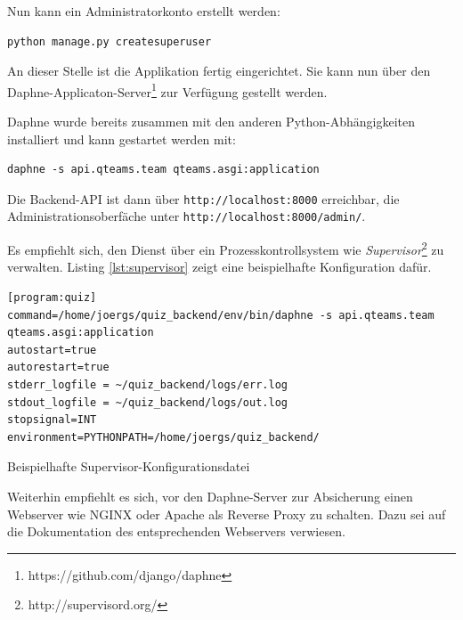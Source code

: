 \documentclass[a4paper,11pt,listof=numbered,glossary=totoc,parskip=half,toc=bib]{scrreprt}
\begin{document}
\begin{appendices}
	Nun kann ein Administratorkonto erstellt werden:
	
	\begin{verbatim}
python manage.py createsuperuser
	\end{verbatim}
	
	An dieser Stelle ist die Applikation fertig eingerichtet. Sie kann nun über den Daphne-Applicaton-Server\footnote{https://github.com/django/daphne} zur Verfügung gestellt werden. 
	
	Daphne wurde bereits zusammen mit den anderen Python-Abhängigkeiten installiert und kann gestartet werden mit:
	
	\begin{verbatim}
daphne -s api.qteams.team qteams.asgi:application
	\end{verbatim}
	
	Die Backend-API ist dann über \texttt{http://localhost:8000} erreichbar, die Administrationsoberfäche unter \texttt{http://localhost:8000/admin/}.
	
	Es empfiehlt sich, den Dienst über ein Prozesskontrollsystem wie \textit{Supervisor}\footnote{http://supervisord.org/} zu verwalten. Listing \ref{lst:supervisor} zeigt eine beispielhafte Konfiguration dafür.
	
	\begin{listing}
		\begin{verbatim}
[program:quiz]
command=/home/joergs/quiz_backend/env/bin/daphne -s api.qteams.team qteams.asgi:application
autostart=true
autorestart=true
stderr_logfile = ~/quiz_backend/logs/err.log
stdout_logfile = ~/quiz_backend/logs/out.log
stopsignal=INT
environment=PYTHONPATH=/home/joergs/quiz_backend/
		\end{verbatim}
		\caption{Beispielhafte Supervisor-Konfigurationsdatei}
		\label{lst:supervisor}
	\end{listing}
	
	Weiterhin empfiehlt es sich, vor den Daphne-Server zur Absicherung einen Webserver wie NGINX oder Apache als Reverse Proxy zu schalten. Dazu sei auf die Dokumentation des entsprechenden Webservers verwiesen.
	

	
	\end{appendices}
	\newpage	
	\setcounter{chapter}{\thelastRomanCounter} %
\renewcommand \thechapter{\Roman{chapter}}	\printbibliography[heading=bibnumbered,title=Literaturverzeichnis]
\end{document}
